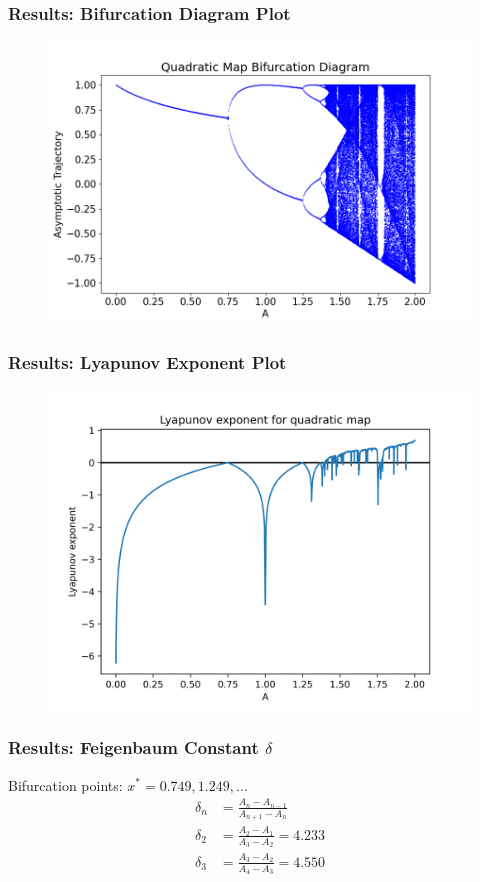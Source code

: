 \documentclass[
	11pt, %
	aspectratio=169, %
]{beamer}
\begin{document}

\begin{frame}
        \frametitle{Results: Bifurcation Diagram Plot}
        \begin{figure}
            \includegraphics[width=0.6\linewidth]
            {quadratic_bifurcation_diagram.png}
        \end{figure}
\end{frame}


\begin{frame}
        \frametitle{Results: Lyapunov Exponent Plot}
        \begin{figure}
            \includegraphics[width=0.6\linewidth]
            {quadratic_lyapunov_exp.png}
        \end{figure}
\end{frame}


\begin{frame}
    \frametitle{Results: Feigenbaum Constant $\delta$}
    Bifurcation points: $x^* = 0.749, 1.249, \dots$ \pause
    \begin{align*}
        \delta_{n} &= \frac{A_{n}-A_{n-1}}{A_{n+1}-A_{n}} \\
        \delta_{2} &= \frac{A_{2}-A_{1}}{A_{3}-A_{2}} = 4.233 \\
        \delta_{3} &= \frac{A_{3}-A_{2}}{A_{4}-A_{3}} = 4.550
    \end{align*}
\end{frame}
\end{document}
